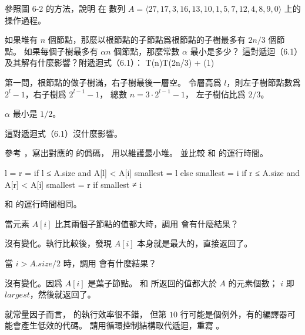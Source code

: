 \startsection[
  title={Maintaining the heap property},
]

\startEXERCISE
參照圖 6-2 的方法，說明  在
數列 $A = \langle 27,17,3,16,13,10,1,5,7,12,4,8,9,0\rangle$ 上的操作過程。
\stopEXERCISE

\startANSWER
\startcombination[2*2]
{\externalfigure[output/e6_2_1-1]}{}
{\externalfigure[output/e6_2_1-2]}{}
{\externalfigure[output/e6_2_1-3]}{}
{}{}
\stopcombination
\stopANSWER

\startEXERCISE
如果堆有 $n$ 個節點，那麼以根節點的子節點爲根節點的子樹最多有 $2n/3$ 個節點。
如果每個子樹最多有 $\alpha n$ 個節點，那麼常數 $\alpha$ 最小是多少？
這對遞迴（6.1）及其解有什麼影響？附遞迴式（6.1）：
\startformula
T(n)\le T(2n/3) + \Theta(1)
\stopformula
\stopEXERCISE

\startANSWER
第一問，根節點的做子樹滿，右子樹最後一層空。
令層高爲 $l$，則左子樹節點數爲 $2^l - 1$，右子樹爲 $2^{l-1} - 1$，
總數 $n=3 \cdot 2^{l-1} - 1$，
左子樹佔比爲 $2/3$。

$\alpha$ 最小是 $1/2$。

這對遞迴式（6.1）沒什麼影響。
\stopANSWER

\startEXERCISE
參考 ，寫出對應的  的僞碼，
用以維護最小堆。
並比較  和  的運行時間。
\stopEXERCISE

\startANSWER
{}
\startCLRSCODE
l = 
r = 
if l ≤ A.size and A[l] < A[i]
	smallest = l
else
	smallest = i
if r ≤ A.size and A[r] < A[i]
	smallest = r
if smallest ≠ i
\stopCLRSCODE

 和  的運行時間相同。
\stopANSWER

\startEXERCISE
當元素 $A[i]$ 比其兩個子節點的值都大時，調用  會有什麼結果？
\stopEXERCISE

\startANSWER
沒有變化。執行比較後，發現 $A[i]$ 本身就是最大的，直接返回了。
\stopANSWER

\startEXERCISE
當 $i > A.size / 2$ 時，調用  會有什麼結果？
\stopEXERCISE

\startANSWER
沒有變化。因爲 $A[i]$ 是葉子節點。  和  所返回的值都大於 $A$ 的元素個數；
 $i$ 即 $largest$，然後就返回了。
\stopANSWER

\startEXERCISE
就常量因子而言，  的執行效率很不錯，
但第 $10$ 行可能是個例外，有的編譯器可能會產生低效的代碼。
請用循環控制結構取代遞迴，重寫 。
\stopEXERCISE

